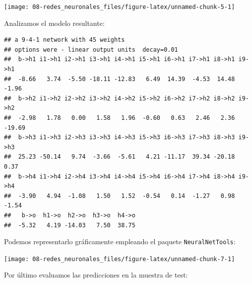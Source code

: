 \documentclass[
  spanish,
]{book}
\newenvironment{Shaded}{\begin{snugshade}}{\end{snugshade}}
\newcommand{\FunctionTok}[1]{\textcolor[rgb]{0.00,0.00,0.00}{#1}}
\newcommand{\NormalTok}[1]{#1}
\newcommand{\SpecialCharTok}[1]{\textcolor[rgb]{0.00,0.00,0.00}{#1}}
\theoremstyle{break}
\theoremstyle{definition}
\theoremstyle{definition}
\theoremstyle{definition}
\theoremstyle{definition}
\theoremstyle{remark}
\begin{document}
\begin{center}\texttt{[image: 08-redes\_neuronales\_files/figure-latex/unnamed-chunk-5-1]} \end{center}

Analizamos el modelo resultante:

\begin{Shaded}
\end{Shaded}

\begin{verbatim}
## a 9-4-1 network with 45 weights
## options were - linear output units  decay=0.01
##  b->h1 i1->h1 i2->h1 i3->h1 i4->h1 i5->h1 i6->h1 i7->h1 i8->h1 i9->h1 
##  -8.66   3.74  -5.50 -18.11 -12.83   6.49  14.39  -4.53  14.48  -1.96 
##  b->h2 i1->h2 i2->h2 i3->h2 i4->h2 i5->h2 i6->h2 i7->h2 i8->h2 i9->h2 
##  -2.98   1.78   0.00   1.58   1.96  -0.60   0.63   2.46   2.36 -19.69 
##  b->h3 i1->h3 i2->h3 i3->h3 i4->h3 i5->h3 i6->h3 i7->h3 i8->h3 i9->h3 
##  25.23 -50.14   9.74  -3.66  -5.61   4.21 -11.17  39.34 -20.18   0.37 
##  b->h4 i1->h4 i2->h4 i3->h4 i4->h4 i5->h4 i6->h4 i7->h4 i8->h4 i9->h4 
##  -3.90   4.94  -1.08   1.50   1.52  -0.54   0.14  -1.27   0.98  -1.54 
##   b->o  h1->o  h2->o  h3->o  h4->o 
##  -5.32   4.19 -14.03   7.50  38.75
\end{verbatim}

Podemos representarlo gráficamente empleando el paquete \texttt{NeuralNetTools}:

\begin{Shaded}
\end{Shaded}

\begin{center}\texttt{[image: 08-redes\_neuronales\_files/figure-latex/unnamed-chunk-7-1]} \end{center}

Por último evaluamos las predicciones en la muestra de test:
\end{document}
